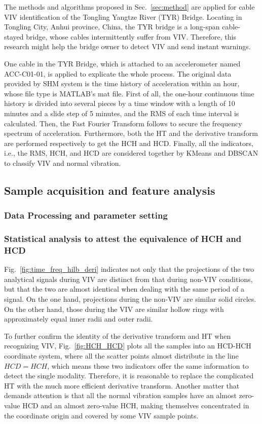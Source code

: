 \documentclass[preprint, 3p, times, compress, 11pt]{elsarticle}
\begin{document}
The methods and algorithms proposed in Sec.~\ref{sec:method} are 
applied for cable VIV identification of the Tongling Yangtze River 
(TYR) Bridge. Locating in Tongling City, Anhui province, China, the TYR bridge 
is a long-span cable-stayed bridge, whose cables intermittently suffer 
from VIV. Therefore, this research might help the bridge owner to 
detect VIV and send instant warnings.

One cable in the TYR Bridge, which is attached to an accelerometer 
named ACC-C01-01, is applied to explicate the whole process. The original 
data provided by SHM system is the time history of acceleration within an 
hour, whose file type is MATLAB's mat file. First of all, the one-hour 
continuous time history is divided into several pieces by a time window 
with a length of 10 minutes and a slide step of 5 minutes, and the RMS 
of each time interval is calculated. Then, the Fast Fourier Transform 
follows to secure the frequency spectrum of acceleration. Furthermore, 
both the HT and the derivative transform are performed respectively to 
get the HCH and HCD. Finally, all the indicators, i.e., the RMS, HCH, 
and HCD are considered together by KMeans and DBSCAN to classify VIV and 
normal vibration. 

\subsection{Sample acquisition and feature analysis}

\subsubsection{Data Processing and parameter setting}

\subsubsection{Statistical analysis to attest the equivalence of HCH and HCD}

Fig.~\ref{fig:time_freq_hilb_deri} indicates not only that the 
projections of the two analytical signals during VIV are distinct from 
that during non-VIV conditions, but that the two are almost identical 
when dealing with the same period of a signal. On the one hand, 
projections during the non-VIV are similar solid circles. On the other 
hand, those during the VIV are similar hollow rings with approximately 
equal inner radii and outer radii.

To further confirm the identity of the derivative transform and HT when 
recognizing VIV, Fig.~\ref{fig:HCH_HCD} plots all the samples into an 
HCD-HCH coordinate system, where all the scatter points almost distribute 
in the line $HCD = HCH$, which means these two indicators offer 
the same information to detect the single modality. 
Therefore, it is reasonable to replace 
the complicated HT with the much more efficient derivative transform. 
Another matter that demands attention is that all the normal vibration 
samples have an almost zero-value HCD and an almost zero-value HCH, 
making themselves concentrated in the coordinate origin and covered by 
some VIV sample points.
\end{document}
